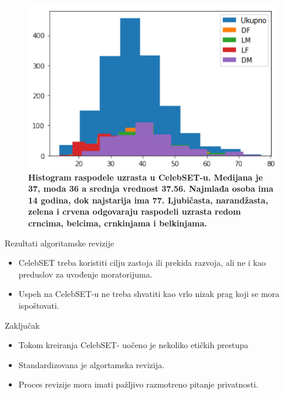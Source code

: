\documentclass{beamer}
\begin{document}
	\begin{frame}
		\begin{figure}[h!]
			\centerline{\includegraphics[width=0.65\linewidth]{hist.PNG}}
			\caption{\textbf{Histogram raspodele uzrasta u CelebSET-u. Medijana je 37, moda 36 a srednja vrednost 37.56. Najmlađa osoba ima 14 godina, dok najstarija ima 77. \textcolor{cc-purple}{Ljubičasta}, \textcolor{cc-orange}{narandžasta}, \textcolor{cc-green}{zelena} i \textcolor{cc-red}{crvena} odgovaraju raspodeli uzrasta redom crncima, belcima, crnkinjama i belkinjama.}}
		\end{figure}
	\end{frame}

	\begin{frame}{Rezultati algoritamske revizije}
		\begin{itemize}
			\item CelebSET treba koristiti cilju zastoja ili prekida razvoja, ali ne i kao preduslov za uvođenje moratorijuma.
			\item Uspeh na CelebSET-u ne treba shvatiti kao vrlo nizak prag koji se mora ispoštovati.
		\end{itemize}
	\end{frame}

	\begin{frame}{Zaključak}
		\begin{itemize}
			\item Tokom kreiranja CelebSET- uočeno je nekoliko etičkih prestupa
			\item Standardizovana je algortamska revizija.
			\item Proces revizije mora imati pažljivo razmotreno pitanje privatnosti.
		\end{itemize}
	\end{frame}
\end{document}
